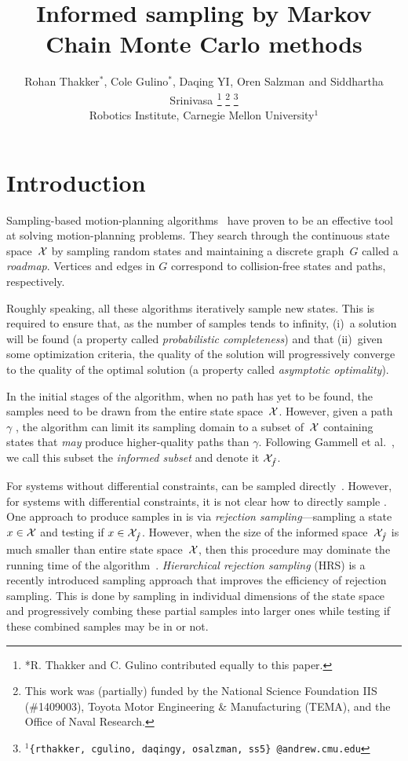 \documentclass[letterpaper, 10 pt, conference]{ieeeconf}  %
\title{\LARGE \bf
Informed sampling by Markov Chain Monte Carlo methods
}
\author{
Rohan Thakker$^{*}$,
Cole Gulino$^{*}$,
Daqing YI$^{}$,
Oren Salzman$^{}$ and
Siddhartha Srinivasa$^{}$%
\thanks{*R. Thakker and C. Gulino contributed equally to this paper.}
\thanks{This work was (partially) funded by the National Science Foundation IIS (\#1409003), Toyota Motor Engineering \& Manufacturing (TEMA), and the Office of Naval Research.}%
\thanks{$^{1}${\tt\small \{rthakker, cgulino, daqingy, osalzman, ss5\} @andrew.cmu.edu}}%
%
\\        
Robotics Institute, Carnegie Mellon University$^{1}$
}
\begin{document}
\maketitle
\thispagestyle{empty}
\pagestyle{empty}


\begin{abstract}

\end{abstract}


\section{Introduction}
Sampling-based motion-planning algorithms~\cite{CBHKKLT05, L06} have proven to be an effective tool at solving motion-planning problems.
They search through the continuous state space~$\mathcal{X}$ by sampling random states and maintaining a discrete graph~$G$ called a \emph{roadmap}.
Vertices and edges in $G$ correspond to collision-free states and paths, respectively.

Roughly speaking, all these algorithms iteratively sample new states.
This is required to ensure that, as the number of samples tends to infinity, 
(i)~a solution will be found 
(a property called \emph{probabilistic completeness})
and that
(ii)~given some optimization criteria, the quality of the solution will progressively converge to the quality of the optimal solution
(a property called \emph{asymptotic  optimality}).

In the initial stages of the algorithm, 
when no path has yet to be found, 
the samples need to be drawn from the entire state space~$\mathcal{X}$.
However, given a path $\gamma$ , the algorithm can limit its sampling domain to a subset of~$\mathcal{X}$  containing states that \emph{may} produce higher-quality paths than $\gamma$.
Following Gammell et al.~\cite{GSB14}, we call this subset the \emph{informed subset} and denote it $\mathcal{X}_{\hat{f}}$.

For systems without differential constraints, \Cinf can be sampled directly~\cite{GSB14}.
However, for systems with differential constraints, it is not clear how to directly sample \Cinf.
One approach to produce samples in \Cinf is via \emph{rejection sampling}---sampling a state $x \in \mathcal{X}$ and testing if $x \in \mathcal{X}_{\hat{f}}$.
However, when the size of the informed space~$\mathcal{X}_{\hat{f}}$ is much smaller than entire state space~$\mathcal{X}$, then this procedure may dominate the running time of the algorithm~\cite{KTC16}.
\emph{Hierarchical rejection sampling} (HRS) is a recently introduced sampling approach that improves the efficiency of rejection sampling.
This is done by sampling in individual dimensions of the state space and progressively combing these partial samples into larger ones while testing if these combined samples may be in \Cinf or not.
\end{document}
